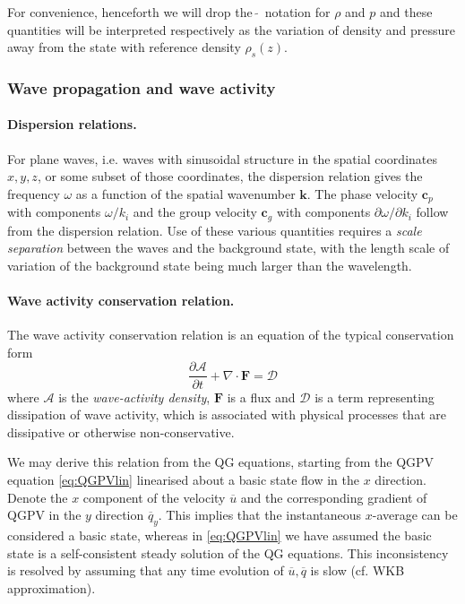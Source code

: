 \documentclass{jknotes}
\begin{document}
For convenience, henceforth we will drop the \,$\tilde{}$\, notation for $\rho$
and $p$ and these quantities will be interpreted respectively as the variation
of density and pressure away from the state with reference density
$\rho_s(z)$.

\subsubsection{Wave propagation and wave activity}
\paragraph{Dispersion relations.}
For plane waves, i.e. waves with sinusoidal structure in the spatial
coordinates $x, y, z$, or some subset of those coordinates, the dispersion
relation gives the frequency $\omega$ as a function of the spatial wavenumber
$\symbf{k}$. The phase velocity $\symbf{c}_p$ with components $\omega/k_i$ and
the group velocity $\symbf{c}_g$ with components $\partial \omega/\partial
k_i$ follow from the dispersion relation. Use of these various quantities
requires a \emph{scale separation} between the waves and the background
state, with the length scale of variation of the background state being much
larger than the wavelength.

\paragraph{Wave activity conservation relation.}
The wave activity conservation relation is an equation of the typical
conservation form
\begin{equation}
	\frac{\partial \mathcal{A}}{\partial t} + \nabla \cdot \symbf{F} =
	\mathcal{D}
\end{equation}
where $\mathcal{A}$ is the \emph{wave-activity density}, $\symbf{F}$ is a flux
and $\mathcal{D}$ is a term representing dissipation of wave activity, which
is associated with physical processes that are dissipative or otherwise
non-conservative.

We may derive this relation from the QG equations, starting from the QGPV
equation \eqref{eq:QGPVlin} linearised about a basic state flow in the $x$
direction. Denote the $x$ component of the velocity $\overline{u}$ and the
corresponding gradient of QGPV in the $y$ direction $\overline{q}_y$. This
implies that the instantaneous $x$-average can be considered a basic state,
whereas in \eqref{eq:QGPVlin} we have assumed the basic state is a
self-consistent steady solution of the QG equations. This inconsistency is
resolved by assuming that any time evolution of $\overline{u}, \overline{q}$ is
slow (cf. WKB approximation).
\end{document}
